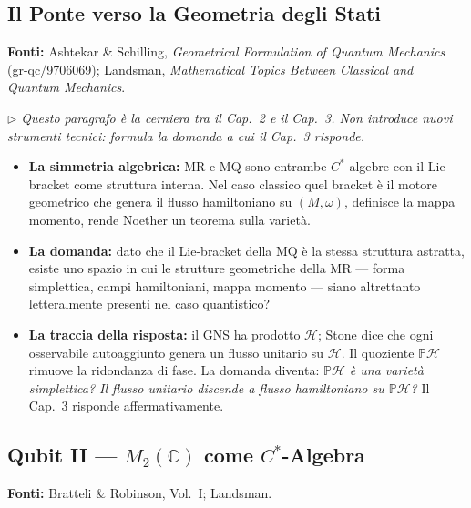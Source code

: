 \documentclass[12pt, a4paper]{article}
\newcommand{\fonti}[1]{%
	\begin{fontebox}
		\textcolor{fontecolor}{\footnotesize\textbf{Fonti:} #1}
	\end{fontebox}%
}
\newcommand{\nota}[1]{%
	\par\smallskip
	\noindent\textit{\small $\triangleright$\; #1}
	\par\smallskip
}
\begin{document}
	\subsection{Il Ponte verso la Geometria degli Stati}
	
	\fonti{Ashtekar \& Schilling, \textit{Geometrical Formulation of Quantum Mechanics}
		(gr-qc/9706069); Landsman, \textit{Mathematical Topics Between Classical and
			Quantum Mechanics}.}
	
	\nota{Questo paragrafo è la cerniera tra il Cap.~2 e il Cap.~3. Non introduce nuovi
		strumenti tecnici: formula la domanda a cui il Cap.~3 risponde.}
	
	\begin{itemize}
		\item \textbf{La simmetria algebrica:} MR e MQ sono entrambe $C^*$-algebre con
		il Lie-bracket come struttura interna. Nel caso classico quel bracket è il motore
		geometrico che genera il flusso hamiltoniano su $(M,\omega)$, definisce la mappa
		momento, rende Noether un teorema sulla varietà.
		\item \textbf{La domanda:} dato che il Lie-bracket della MQ è la stessa struttura
		astratta, esiste uno spazio in cui le strutture geometriche della MR --- forma
		simplettica, campi hamiltoniani, mappa momento --- siano altrettanto letteralmente
		presenti nel caso quantistico?
		\item \textbf{La traccia della risposta:} il GNS ha prodotto $\mathcal{H}$; Stone
		dice che ogni osservabile autoaggiunto genera un flusso unitario su $\mathcal{H}$.
		Il quoziente $\mathbb{P}\mathcal{H}$ rimuove la ridondanza di fase. La domanda
		diventa: \emph{$\mathbb{P}\mathcal{H}$ è una varietà simplettica? Il flusso
			unitario discende a flusso hamiltoniano su $\mathbb{P}\mathcal{H}$?} Il Cap.~3
		risponde affermativamente.
	\end{itemize}
	
	\subsection{Qubit II --- $M_2(\mathbb{C})$ come $C^*$-Algebra}
	
	\fonti{Bratteli \& Robinson, Vol.~I; Landsman.}
	
\end{document}
